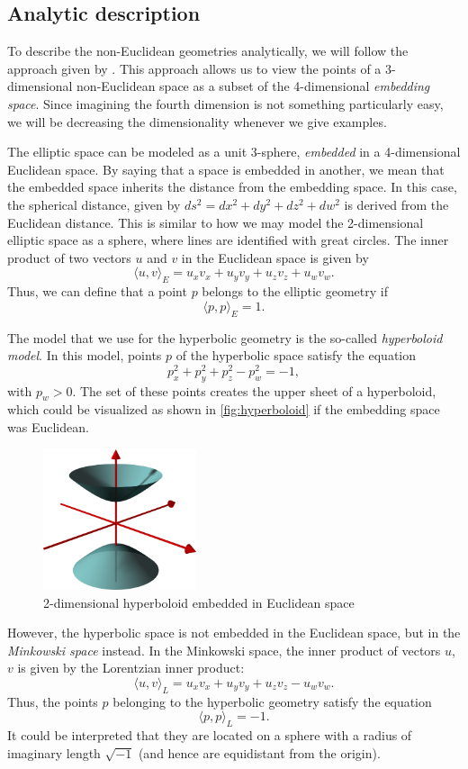 \subsection{Analytic description}
To describe the non-Euclidean geometries analytically, we will follow the approach given by \cite{Szirmay-Kalos2022}.
This approach allows us to view the points of a 3-dimensional non-Euclidean space as a subset of the 4-dimensional \textit{embedding space}.
Since imagining the fourth dimension is not something particularly easy, we will be decreasing the dimensionality whenever we give examples.

The elliptic space can be modeled as a unit 3-sphere, \textit{embedded} in a 4-dimensional Euclidean space.
By saying that a space is embedded in another, we mean that the embedded space inherits the distance from the embedding space.
In this case, the spherical distance, given by $ds^2 = dx^2 + dy^2 + dz^2 + dw^2$ is derived from the Euclidean distance.
This is similar to how we may model the 2-dimensional elliptic space as a sphere, where lines are identified with great circles.
The inner product of two vectors $u$ and $v$ in the Euclidean space is given by
$$ \langle u, v \rangle_E  = u_xv_x + u_yv_y + u_zv_z + u_wv_w.$$
Thus, we can define that a point $p$ belongs to the elliptic geometry if
$$ \langle p, p \rangle_E = 1.$$

The model that we use for the hyperbolic geometry is the so-called \textit{hyperboloid model}.
In this model, points $p$ of the hyperbolic space satisfy the equation
$$p_x^2 + p_y^2 + p_z^2 - p_w^2 = -1,$$
with $p_w > 0$.
The set of these points creates the upper sheet of a hyperboloid, which could be visualized as shown in \autoref{fig:hyperboloid} if the embedding space was Euclidean.
\begin{figure}[h]
    \centering
    \includegraphics[width=0.4\textwidth]{chapters/theoretical_foundations/sections/non-eudlidean-spaces/resources/hyperboloid.png}
    \caption{2-dimensional hyperboloid embedded in Euclidean space}
    \label{fig:hyperboloid}
\end{figure}
However, the hyperbolic space is not embedded in the Euclidean space, but in the \textit{Minkowski space} instead.
In the Minkowski space, the inner product of vectors $u$, $v$ is given by the Lorentzian inner product:
$$\langle u, v \rangle_L = u_xv_x + u_yv_y + u_zv_z - u_wv_w.$$
Thus, the points $p$ belonging to the hyperbolic geometry satisfy the equation
$$\langle p, p \rangle_L = -1.$$
It could be interpreted that they are located on a sphere with a radius of imaginary length $\sqrt{-1}$ (and hence are equidistant from the origin).

